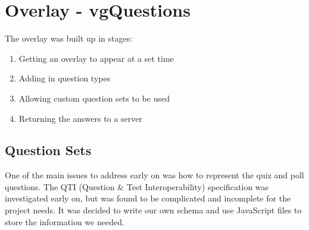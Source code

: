 \chapter{Overlay - vgQuestions} \label{Chapter:Overlay}

The overlay was built up in stages:
\begin{enumerate}
\item Getting an overlay to appear at a set time
\item Adding in question types
\item Allowing custom question sets to be used
\item Returning the answers to a server
\end{enumerate}

\section{Question Sets} 
\label{Section:Question sets}
One of the main issues to address early on was how to represent the quiz and poll questions. The QTI (Question \& Test Interoperability) specification was investigated early on, but was found to be complicated and incomplete for the project needs. It was decided to write our own schema and use JavaScript files to store the information we needed. 

